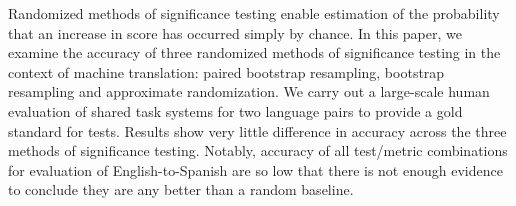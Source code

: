 Randomized methods of significance testing enable estimation of the probability that an increase in score has occurred simply by chance. In this paper, we examine the accuracy of three randomized methods of significance testing in the context of machine translation: paired bootstrap resampling, bootstrap resampling and approximate randomization. We carry out a large-scale human evaluation of shared task systems for two language pairs to provide a gold standard for tests. Results show very little difference in accuracy across the three methods of significance testing. Notably, accuracy of all test/metric combinations for evaluation of English-to-Spanish are so low that there is not enough evidence to conclude they are any better than a random baseline.
